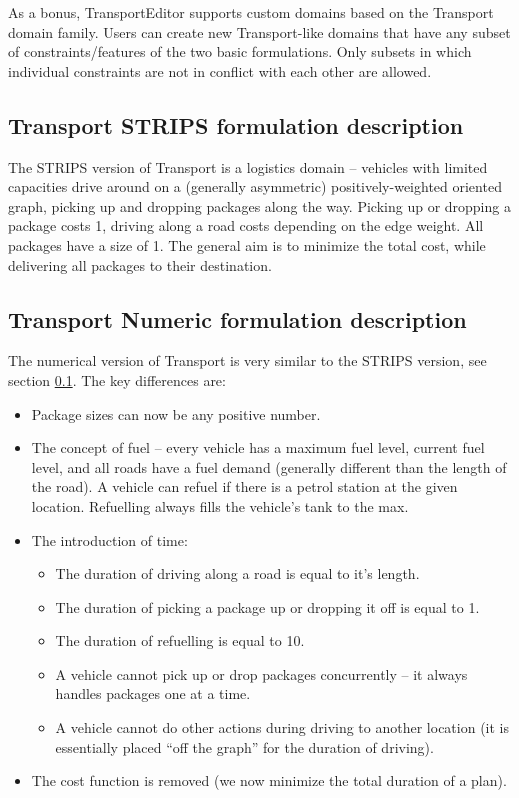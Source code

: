 \documentclass[10pt,a4paper,oneside]{article}
\newcommand{\pname}{TransportEditor} %
\begin{document}
As a bonus, \pname{} supports custom domains based on the Transport domain family. Users can create new Transport-like domains that have any subset of constraints/features of the two basic formulations. Only subsets in which individual constraints are not in conflict with each other are allowed.

\subsection{Transport STRIPS formulation description}\label{transport-strips}

The STRIPS version of Transport is a logistics domain -- vehicles with limited capacities drive around on a (generally asymmetric) positively-weighted oriented graph, picking up and dropping packages along the way. Picking up or dropping a package costs 1, driving along a road costs depending on the edge weight. All packages have a size of 1. The general aim is to minimize the total cost, while delivering all packages to their destination.

\subsection{Transport Numeric formulation description}\label{transport-numeric}

The numerical version of Transport is very similar to the STRIPS version, see section \ref{transport-strips}. The key differences are:
\begin{itemize}
\item Package sizes can now be any positive number.
\item The concept of fuel -- every vehicle has a maximum fuel level, current fuel level, and all roads have a fuel demand (generally different than the length of the road). A vehicle can refuel if there is a petrol station at the given location. Refuelling always fills the vehicle's tank to the max.
\item The introduction of time:
\begin{itemize}
\item The duration of driving along a road is equal to it's length.
\item The duration of picking a package up or dropping it off is equal to 1.
\item The duration of refuelling is equal to 10.
\item A vehicle cannot pick up or drop packages concurrently -- it always handles packages one at a time.
\item A vehicle cannot do other actions during driving to another location (it is essentially placed ``off the graph'' for the duration of driving).
\end{itemize}
\item The cost function is removed (we now minimize the total duration of a plan).
\end{itemize}
\end{document}
